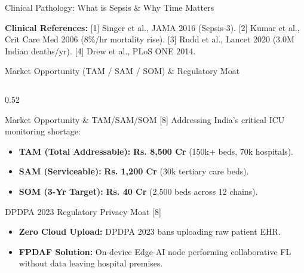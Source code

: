 \documentclass[aspectratio=169, 11pt]{beamer}
\begin{document}
\begin{frame}{Clinical Pathology: What is Sepsis \& Why Time Matters}
    \vspace{0.01cm}
    \begin{block}{}
        \tiny \textcolor{neonCyan}{\textbf{Clinical References:}} \textcolor{mutedText}{[1] Singer et al., JAMA 2016 (Sepsis-3). [2] Kumar et al., Crit Care Med 2006 (8\%/hr mortality rise). [3] Rudd et al., Lancet 2020 (3.0M Indian deaths/yr). [4] Drew et al., PLoS ONE 2014.}
    \end{block}
\end{frame}

\begin{frame}{Market Opportunity (TAM / SAM / SOM) \& Regulatory Moat}
    \begin{columns}[c]
        \begin{column}{0.52\textwidth}
            \begin{block}{\textcolor{neonCyan}{Market Opportunity \& TAM/SAM/SOM [8]}}
                \tiny
                Addressing India's critical ICU monitoring shortage:
                \begin{itemize}
                    \item \textbf{TAM (Total Addressable):} \textbf{Rs. 8,500 Cr} (150k+ beds, 70k hospitals).
                    \item \textbf{SAM (Serviceable):} \textbf{Rs. 1,200 Cr} (30k tertiary care beds).
                    \item \textbf{SOM (3-Yr Target):} \textbf{Rs. 40 Cr} (2,500 beds across 12 chains).
                \end{itemize}
            \end{block}

            \begin{block}{\textcolor{neonAmber}{DPDPA 2023 Regulatory Privacy Moat [8]}}
                \tiny
                \begin{itemize}
                    \item \textbf{Zero Cloud Upload:} DPDPA 2023 bans uploading raw patient EHR.
                    \item \textbf{FPDAF Solution:} On-device Edge-AI node performing collaborative FL without data leaving hospital premises.
                \end{itemize}
            \end{block}
        \end{column}
        

\end{columns}
\end{frame}
\end{document}
